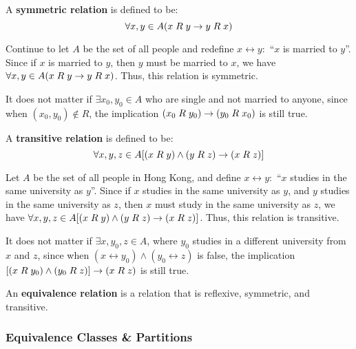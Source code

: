 \begin{definition}
    A \textbf{symmetric relation} is defined to be:
    \[
        \forall x, y \in A (x\mathrel R y \rightarrow y\mathrel R x)
    \]    
\end{definition}

\begin{example}
    Continue to let $A$ be the set of all people and redefine $x\rel y:$ ``$x$ is married to $y$''.
    Since if $x$ is married to $y$, then $y$ must be married to $x$, we have
    $\forall x, y \in A (x\mathrel R y \rightarrow y\mathrel R x)$.
    Thus, this relation is symmetric.
    \begin{remark}
        It does not matter if $\exists x_0, y_0\in A$ who are single and not married to anyone,
        since when $(x_0, y_0) \notin R$, the implication $(x_0\mathrel R y_0) \rightarrow (y_0\mathrel R x_0)$ is 
        still true.
    \end{remark}
\end{example}

\begin{definition}
    A \textbf{transitive relation} is defined to be:
    \[
        \forall x, y, z \in A [(x\mathrel R y) \land (y\mathrel R z) \rightarrow (x\mathrel R z)]
    \]
\end{definition}

\begin{example}
    Let $A$ be the set of all people in Hong Kong, and define $x\rel y:$ ``$x$ studies in the
    same university as $y$''.
    Since if $x$ studies in the same university as $y$, and $y$ studies in the same university
    as $z$, then $x$ must study in the same university as $z$, we have
    $\forall x, y, z \in A [(x\mathrel R y) \land (y\mathrel R z) \rightarrow (x\mathrel R z)]$.
    Thus, this relation is transitive.

    \begin{remark}
        It does not matter if $\exists x,y_0,z\in A$, where $y_0$ studies in a different
        university from $x$ and $z$, since when $(x\rel y_0) \land (y_0\rel z)$ is false,
        the implication $[(x\mathrel R y_0) \land (y_0\mathrel R z)] \rightarrow (x\mathrel R z)$ is still true.
    \end{remark}
\end{example}

\begin{definition}
    An \textbf{equivalence relation} is a relation that is reflexive, symmetric, and transitive.
\end{definition}

\subsubsection{Equivalence Classes \& Partitions}